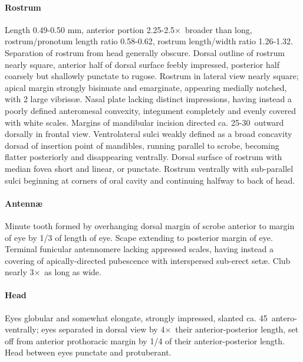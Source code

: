 \documentclass[fleqn,10pt,lineno]{wlpeerj} %
\newcommand{\td}{\textdegree~}
\newcommand{\x}{$\times$~}
\begin{document}
			\paragraph{Rostrum}
				Length 0.49-0.50 mm, anterior portion 2.25-2.5\x broader than long, rostrum/pronotum length ratio 0.58-0.62, rostrum length/width ratio 1.26-1.32.
				Separation of rostrum from head generally obscure. 
				Dorsal outline of rostrum nearly square, anterior half of dorsal surface feebly impressed, posterior half coarsely but shallowly punctate to rugose. 
				Rostrum in lateral view nearly square; apical margin strongly bisinuate and emarginate, appearing medially notched, with 2 large vibriss{\ae}. 
				Nasal plate lacking distinct impressions, having instead a poorly defined anteromesal convexity, integument completely and evenly covered with white scales. 
				Margins of mandibular incision directed ca. 25-30\td outward dorsally in frontal view. 
				Ventrolateral sulci weakly defined as a broad concavity dorsad of insertion point of mandibles, running parallel to scrobe, becoming flatter posteriorly and disappearing ventrally.
				Dorsal surface of rostrum with median fovea short and linear, or punctate.
				Rostrum ventrally with sub-parallel sulci beginning at corners of oral cavity and continuing halfway to back of head.
			\paragraph{Antenn{\ae}}
				Minute tooth formed by overhanging dorsal margin of scrobe anterior to margin of eye by 1/3 of length of eye.
				Scape extending to posterior margin of eye.
				Terminal funicular antennomere lacking appressed scales, having instead a covering of apically-directed pubescence with interspersed sub-erect set{\ae}.
				Club nearly 3\x as long as wide.
			\paragraph{Head}
				Eyes globular and somewhat elongate, strongly impressed, slanted ca. 45\td antero-ventrally; eyes separated in dorsal view by 4\x their anterior-posterior length, set off from anterior prothoracic margin by 1/4 of their anterior-posterior length. 
				Head between eyes punctate and protuberant.
\end{document}
